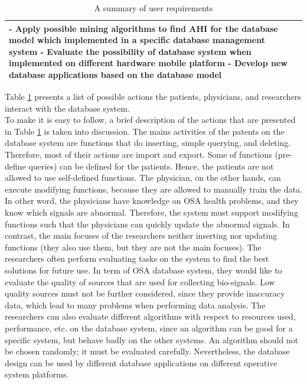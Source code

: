 \begin{table}[!htbp]
\begin{center}
\begin{tabular}{ |p{3cm}||p{10cm}|}
 - Apply possible mining algorithms to find AHI for the database model which implemented in a specific database management system\newline
 - Evaluate the possibility of database system when implemented on different hardware mobile platform\newline
 - Develop new database applications based on the database model\\
 \hline
\end{tabular}
\end{center}
\caption{A summary of user requirements}
\label{tab:userrequirementDB}
\end{table}
Table \ref{tab:userrequirementDB} presents a list of possible actions the patients, physicians, and researchers interact with the database system.\\
To make it is easy to follow, a brief description of the actions that are presented in Table \ref{tab:userrequirementDB} is taken into discussion. The mains activities of the patents on the database system are functions that do inserting, simple querying, and deleting. Therefore, most of their actions are import and export. Some of functions (pre-define queries) can be defined for the patients. Hence, the patients are not allowed to use self-defined functions. The physician, on the other hands, can execute modifying functions, because they are allowed to manually train the data. In other word, the physicians have knowledge on OSA health problems, and they know which signals are abnormal. Therefore, the system must support modifying functions such that the physicians can quickly update the abnormal signals. In contrast, the main focuses of the researchers neither inserting nor updating functions (they also use them, but they are not the main focuses). The researchers often perform evaluating tasks on the system to find the best solutions for future use. In term of OSA database system, they would like to evaluate the quality of sources that are used for collecting bio-signals. Low quality sources must not be further considered, since they provide inaccuracy data, which lead to many problems when performing data analysis. The researchers can also evaluate different algorithms with respect to resources used, performance, etc. on the database system, since an algorithm can be good for a specific system, but behave badly on the other systems. An algorithm should not be chosen randomly; it must be evaluated carefully. Nevertheless, the database design can be used by different database applications on different operative system platforms.
